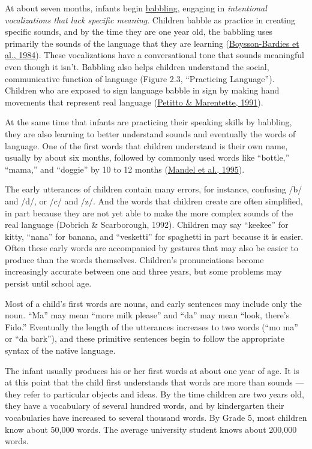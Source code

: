 \documentclass[
]{krantz}
\begin{document}
At about seven months, infants begin \protect\hyperlink{babbling}{babbling}, engaging in \emph{intentional vocalizations that lack specific meaning}. Children babble as practice in creating specific sounds, and by the time they are one year old, the babbling uses primarily the sounds of the language that they are learning (\protect\hyperlink{ref-deBoysson-Bardies1984}{Boysson-Bardies et al., 1984}). These vocalizations have a conversational tone that sounds meaningful even though it isn't. Babbling also helps children understand the social, communicative function of language (Figure 2.3, ``Practicing Language''). Children who are exposed to sign language babble in sign by making hand movements that represent real language (\protect\hyperlink{ref-Petitto1991}{Petitto \& Marentette, 1991}).

At the same time that infants are practicing their speaking skills by babbling, they are also learning to better understand sounds and eventually the words of language. One of the first words that children understand is their own name, usually by about six months, followed by commonly used words like ``bottle,'' ``mama,'' and ``doggie'' by 10 to 12 months (\protect\hyperlink{ref-Mandel1995}{Mandel et al., 1995}).

The early utterances of children contain many errors, for instance, confusing /b/ and /d/, or /c/ and /z/. And the words that children create are often simplified, in part because they are not yet able to make the more complex sounds of the real language (Dobrich \& Scarborough, 1992). Children may say ``keekee'' for kitty, ``nana'' for banana, and ``vesketti'' for spaghetti in part because it is easier. Often these early words are accompanied by gestures that may also be easier to produce than the words themselves. Children's pronunciations become increasingly accurate between one and three years, but some problems may persist until school age.

Most of a child's first words are nouns, and early sentences may include only the noun. ``Ma'' may mean ``more milk please'' and ``da'' may mean ``look, there's Fido.'' Eventually the length of the utterances increases to two words (``mo ma'' or ``da bark''), and these primitive sentences begin to follow the appropriate syntax of the native language.

The infant usually produces his or her first words at about one year of age. It is at this point that the child first understands that words are more than sounds --- they refer to particular objects and ideas. By the time children are two years old, they have a vocabulary of several hundred words, and by kindergarten their vocabularies have increased to several thousand words. By Grade 5, most children know about 50,000 words. The average university student knows about 200,000 words.
\end{document}

